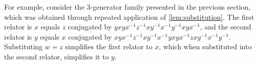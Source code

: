 For example, consider the 3-generator family presented in the previous section, which was obtained through repeated application of \cref{lem:substitution}. The first relator is $x$ equals $z$ conjugated by  $yxyx^{-1}z^{-1}xy^{-1}x^{-1}y^{-1}xyx^{-1}$, and the second relator is $y$ equals $x$ conjugated by $xyx^{-1}z^{-1}xy^{-1}x^{-1}yxyx^{-1}zxy^{-1}x^{-1}y^{-1}$. Substituting $w=z$ simplifies the first relator to $x$, which when substituted into the second relator, simplifies it to $y$. 

